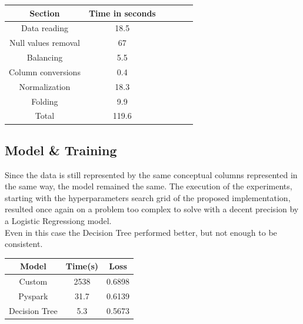 \documentclass[
	letterpaper, %
	10pt, %
]{class}
\begin{document}
\begin{center}
    \begin{tabular}{ |c|c|c|c|c|c| }
        \hline
        Section             & Time in seconds \\
        \hline
        Data reading        & 18.5            \\
        Null values removal & 67              \\
        Balancing           & 5.5             \\
        Column conversions  & 0.4             \\
        Normalization       & 18.3            \\
        Folding             & 9.9             \\
        Total               & 119.6           \\
        \hline
    \end{tabular}
\end{center}

\subsection{Model \& Training}
Since the data is still represented by the same conceptual columns represented in the same way, the model remained the same.
The execution of the experiments, starting with the hyperparameters search grid of the proposed implementation, resulted once again on a problem too complex to solve with a decent precision by a Logistic Regressiong model.\\
Even in this case the Decision Tree performed better, but not enough to be consistent.


\begin{center}
    \begin{tabular}{ |c|c|c| }
        \hline
        Model         & Time(s) & Loss   \\
        \hline
        Custom        & 2538    & 0.6898 \\
        \hline
        Pyspark       & 31.7    & 0.6139 \\
        \hline
        Decision Tree & 5.3     & 0.5673 \\
        \hline
    \end{tabular}
\end{center}
\end{document}
